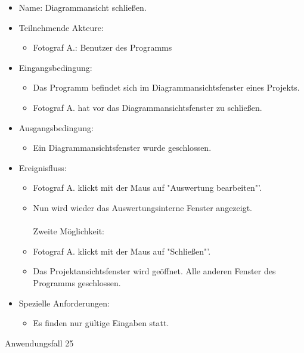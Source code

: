 \begin{itemize}
\item Name: Diagrammansicht schließen.
\item Teilnehmende Akteure:
\begin{itemize}
\item Fotograf A.: Benutzer des Programms
\end{itemize}
\item Eingangsbedingung:
\begin{itemize}
\item Das Programm befindet sich im Diagrammansichtsfenster eines Projekts.
\item Fotograf A. hat vor das Diagrammansichtsfenster zu schließen.
\end{itemize}
\item Ausgangsbedingung:
\begin{itemize}
\item Ein Diagrammansichtsfenster wurde geschlossen.
\end{itemize}
\item Ereignisfluss:
\begin{itemize}
\\Erste Möglichkeit:\\
\item Fotograf A. klickt mit der Maus auf "Auswertung bearbeiten"'.
\item Nun wird wieder das Auswertungsinterne Fenster angezeigt.\\\\Zweite Möglichkeit:\\
\item Fotograf A. klickt mit der Maus auf "Schließen"'.
\item Das Projektansichtsfenster wird geöffnet. Alle anderen Fenster des Programms geschlossen.
\end{itemize}
\item Spezielle Anforderungen:
\begin{itemize}
\item Es finden nur gültige Eingaben statt.
\end{itemize}
\end{itemize}

\begin{description}
\item[Anwendungsfall 25]
\end{description}
 
